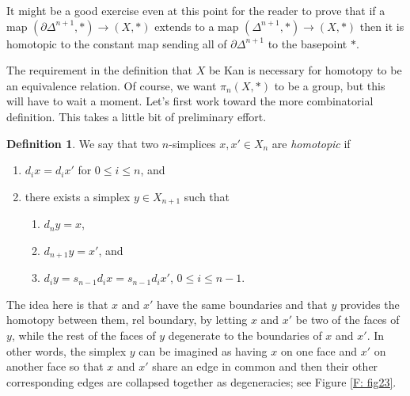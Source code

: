 \documentclass[12pt]{article}
\theoremstyle{plain}
\theoremstyle{definition}
\newtheorem{definition}[theorem]{Definition}
\theoremstyle{remark}
\newcommand{\bd}{\partial}
\begin{document}
It might be a good exercise even at this point for the reader to prove that if a map $(\bd \Delta^{n+1},*)\to (X,*)$ extends to a map $(\Delta^{n+1},*)\to (X,*)$ then it is homotopic to the constant map sending all of $\bd \Delta^{n+1}$ to the basepoint $*$.

The requirement in the definition that $X$ be Kan is necessary for homotopy to be an equivalence relation. Of course, we want $\pi_n(X,*)$ to be a group, but this will have to wait a moment. Let's first work toward the more combinatorial definition. This takes a little bit of preliminary effort. 

 
\begin{definition}\label{D: homotopy of simplices}
We say that two $n$-simplices $x,x'\in X_n$ are \emph{homotopic} if 
\begin{enumerate}
\item $d_ix=d_ix'$ for $0\leq i\leq n$, and 
\item there exists a simplex $y\in X_{n+1}$ such that 
\begin{enumerate}
\item $d_ny=x$, 
\item $d_{n+1}y=x'$, and
\item $d_iy=s_{n-1}d_ix=s_{n-1}d_ix'$, $0\leq i\leq n-1$. 
\end{enumerate}
\end{enumerate}
\end{definition}

The idea  here  is that $x$ and $x'$ have the same boundaries and that $y$ provides the homotopy between them, rel boundary, by letting $x$ and $x'$ be two of the faces of $y$, while the rest of the faces of $y$ degenerate to the boundaries of $x$ and $x'$.  In other words, the simplex $y$ can be imagined as having $x$ on one face and $x'$ on another face so that $x$ and $x'$ share an edge in common and then their other corresponding edges are collapsed together as degeneracies; see Figure \ref{F: fig23}.
\end{document}

